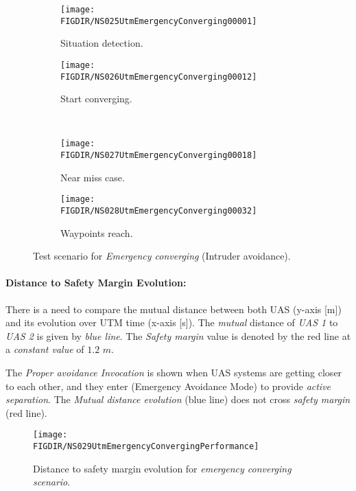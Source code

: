 \begin{figure}[H]
    \centering
    \begin{subfigure}{0.48\textwidth}
    	\centering
        \texttt{[image: \\FIGDIR/NS025UtmEmergencyConverging00001]}
        \caption{Situation detection.}
        \label{fig:emergencyConvergingSituationDetection}
    \end{subfigure}
    \begin{subfigure}{0.48\textwidth}
    	\centering
        \texttt{[image: \\FIGDIR/NS026UtmEmergencyConverging00012]} 
        \caption{Start converging.}
        \label{fig:emergencyConvergingStart}
    \end{subfigure}
    \\
    \begin{subfigure}{0.48\textwidth}
    	\centering
        \texttt{[image: \\FIGDIR/NS027UtmEmergencyConverging00018]} 
        \caption{Near miss case.}
        \label{fig:emergencyConvergingEnd}
    \end{subfigure}
    \begin{subfigure}{0.48\textwidth}
    	\centering
        \texttt{[image: \\FIGDIR/NS028UtmEmergencyConverging00032]} 
        \caption{Waypoints reach.}
        \label{fig:emergencyConvergingWaypointReach}
    \end{subfigure}
    \caption{Test scenario for \emph{Emergency converging} (Intruder avoidance). }
    \label{fig:testCaseEmergencyConverging}
\end{figure}


\paragraph{Distance to Safety Margin Evolution:} There is a need to compare the mutual distance between both UAS (y-axis [m]) and its evolution over UTM time (x-axis [s]). The \emph{mutual} distance of \emph{UAS 1} to \emph{UAS 2} is given by \emph{blue line}. The \emph{Safety margin} value is denoted by the red line at a  \emph{constant value} of $1.2$ $m$.

The \emph{Proper avoidance Invocation} is shown when UAS systems are getting closer to each other, and they enter (Emergency Avoidance Mode) to provide \emph{active separation}. The \emph{Mutual distance evolution} (blue line) does not cross \emph{safety margin} (red line).

\begin{figure}[H]
    \centering
    \texttt{[image: \\FIGDIR/NS029UtmEmergencyConvergingPerformance]} 
    \caption{Distance to safety margin evolution for \emph{emergency converging scenario}.}
    \label{fig:testCaseEmergencyConvergingAvoidancePerformance}
\end{figure}


